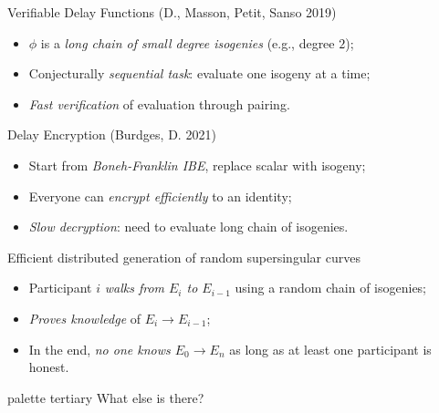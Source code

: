 \documentclass[aspectratio=169]{beamer}
\begin{document}
\begin{frame}
  \begin{block}{Verifiable Delay Functions \small(D., Masson, Petit, Sanso 2019)}
    \begin{itemize}
    \item $\phi$ is a \emph{long chain of small degree isogenies} (e.g., degree $2$);
    \item Conjecturally \emph{sequential task}: evaluate one isogeny at a time;
    \item \emph{Fast verification} of evaluation through pairing.
    \end{itemize}
  \end{block}
  
  \begin{block}{Delay Encryption \small(Burdges, D. 2021)}
    \begin{itemize}
    \item Start from \emph{Boneh-Franklin IBE}, replace scalar with isogeny;
    \item Everyone can \emph{encrypt efficiently} to an identity;
    \item \emph{Slow decryption}: need to evaluate long chain of isogenies.
    \end{itemize}
  \end{block}

  \begin{block}{Efficient distributed generation of random supersingular curves}
    \begin{itemize}
    \item Participant $i$ \emph{walks from $E_i$ to $E_{i-1}$} using a
      random chain of isogenies;
    \item \emph{Proves knowledge} of $E_i\to E_{i-1}$;
    \item In the end, \emph{no one knows $E_0 \to E_n$} as long as at
      least one participant is honest.
    \end{itemize}
  \end{block}
\end{frame}


\begin{frame}[plain]
  \begin{beamercolorbox}[sep=0.1px,center,wd=\paperwidth,sep=0.5\paperheight]{palette tertiary}
        \Huge\centering What else is there?
  \end{beamercolorbox}
\end{frame}
\end{document}
